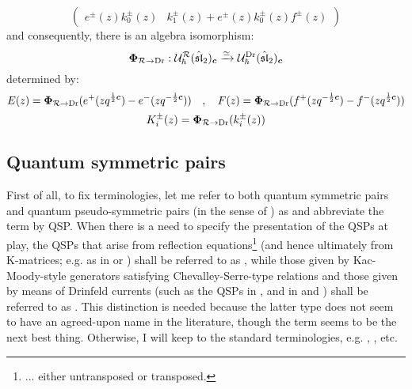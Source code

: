 \begin{remark}
\begin{equation}
\begin{pmatrix}
                            e^{\pm}(z) k_0^{\pm}(z) & k_1^{\pm}(z) + e^{\pm}(z) k_0^{\pm}(z) f^{\pm}(z)
                        \end{pmatrix}
                    \end{equation}
                and consequently, there is an algebra isomorphism:
                \begin{equation} \label{equation: ding_frenkel_isomorphism_quantum_affine_sl_2}
                    \boldsymbol{\Phi}_{\mathcal{R} \to \mathrm{Dr}}: \mathcal{U}_{\hbar}^{\mathcal{R}}(\hat{\mathfrak{sl}}_2)_{\boldsymbol{c}} \xrightarrow[]{\simeq} \mathcal{U}_{\hbar}^{\mathrm{Dr}}(\hat{\mathfrak{sl}}_2)_{\boldsymbol{c}}
                \end{equation}
                determined by:
                    \begin{equation}
                        E(z) = \boldsymbol{\Phi}_{\mathcal{R} \to \mathrm{Dr}}( e^+(z q^{\frac12 \boldsymbol{c}}) - e^-(z q^{-\frac12 \boldsymbol{c}}) ) \quad, \quad F(z) = \boldsymbol{\Phi}_{\mathcal{R} \to \mathrm{Dr}}( f^+(z q^{-\frac12 \boldsymbol{c}}) - f^-(z q^{\frac12 \boldsymbol{c}}) )
                    \end{equation}
                    \begin{equation}
                        K_i^{\pm}(z) = \boldsymbol{\Phi}_{\mathcal{R} \to \mathrm{Dr}}( k_i^{\pm}(z) )
                    \end{equation}
            \end{remark}

        \subsection{Quantum symmetric pairs}
            First of all, to fix terminologies, let me refer to both quantum symmetric pairs and quantum pseudo-symmetric pairs (in the sense of \cite{regelskis_vlaar_kac_moody_pseudo_symmetric_pairs}) as  and abbreviate the term by QSP. When there is a need to specify the presentation of the QSPs at play, the QSPs that arise from reflection equations\footnote{... either untransposed or transposed.} (and hence ultimately from K-matrices; e.g. as in \cite{molev_ragoucy_sorba_twisted_q_yangians_type_A} or \cite{guay_regelskis_twisted_yangians_for_symmetric_pairs_of_types_BCD}) shall be referred to as , while those given by Kac-Moody-style generators satisfying Chevalley-Serre-type relations and those given by means of Drinfeld currents (such as the QSPs in \cite{regelskis_vlaar_reflection_matrices_coideal_subalgebras}, and in \cite{lu_wang_drinfeld_current_presentation_for_affine_iQUEs_1} and \cite{zhang_drinfeld_current_presentation_for_affine_iQUEs_2}) shall be referred to as . This distinction is needed because the latter type does not seem to have an agreed-upon name in the literature, though the term  seems to be the next best thing. Otherwise, I will keep to the standard terminologies, e.g. , , etc.
        
